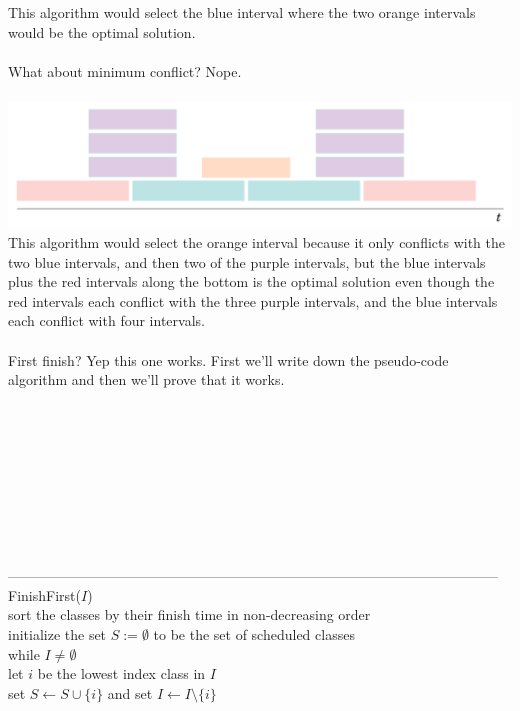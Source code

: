 \documentclass{article}
\newcommand{\emp}{\emptyset}
\begin{document}
This algorithm would select the blue interval where the two orange intervals would be the optimal solution.\\\\
What about minimum conflict? Nope.\\\\
\includegraphics[scale=0.3]{ce3.png}\\
This algorithm would select the orange interval because it only conflicts with the two blue intervals, and then two of the purple intervals, but the blue intervals plus the red intervals along the bottom is the optimal solution even though the red intervals each conflict with the three purple intervals, and the blue intervals each conflict with four intervals.\\\\
First finish? Yep this one works. First we'll write down the pseudo-code algorithm and then we'll prove that it works.\\\\\\\\\\\\\\\\\\\\
---------------------------------------------------------------------------------------------------------
FinishFirst($I$)\\
	\hspace*{7mm} sort the classes by their finish time in non-decreasing order\\
	\hspace*{7mm} initialize the set $S := \emp$ to be the set of scheduled classes\\
	\hspace*{7mm} while $I \neq \emp$\\
	\hspace*{14mm} let $i$ be the lowest index class in $I$\\
	\hspace*{14mm} set $S \leftarrow S \cup \{i\}$ and set $I \leftarrow I \setminus \{i\}$\\
\end{document}
